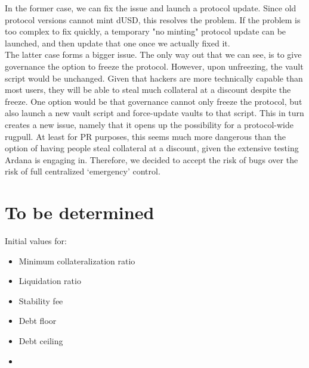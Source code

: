\documentclass{article} %
\begin{document}
In the former case, we can fix the issue and launch a protocol update. Since old
protocol versions cannot mint dUSD, this resolves the problem.
If the problem is too complex to fix quickly, a temporary "no minting" protocol
update can be launched, and then update that one once we actually fixed it. \\

The latter case forms a bigger issue.
The only way out that we can see, is to give governance the option to freeze the
protocol.
However, upon unfreezing, the vault script would be unchanged.
Given that hackers are more technically capable than most users, they will be
able to steal much collateral at a discount despite the freeze.
One option would be that governance cannot only freeze the protocol, but also
launch a new vault script and force-update vaults to that script.
This in turn creates a new issue, namely that it opens up the possibility for a
protocol-wide rugpull.
At least for PR purposes, this seems much more dangerous than the option of
having people steal collateral at a discount, given the extensive testing Ardana
is engaging in.
Therefore, we decided to accept the risk of bugs over the risk of full
centralized `emergency' control.

\section{To be determined}

Initial values for:
\begin{itemize}
  \item Minimum collateralization ratio
  \item Liquidation ratio
  \item Stability fee
  \item Debt floor
  \item Debt ceiling
  \item {}
\end{itemize}
\end{document}
